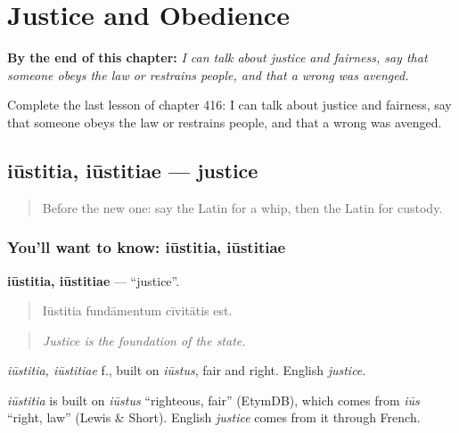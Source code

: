 
\chapter{Justice and Obedience}
\label{ch:la-justice-and-obedience}

\begin{chapteropening}
\textbf{By the end of this chapter:} \emph{I can talk about justice and fairness, say that someone obeys the law or restrains people, and that a wrong was avenged.}

Complete the last lesson of chapter 416: I can talk about justice and fairness, say that someone obeys the law or restrains people, and that a wrong was avenged.
\end{chapteropening}

\section[iūstitia, iūstitiae]{iūstitia, iūstitiae — justice}

\label{lesson:LA-C416-iustitia}



\begin{quote}
Before the new one: say the Latin for a whip, then the Latin for custody.
\end{quote}

\subsection*{You'll want to know: iūstitia, iūstitiae}
\textbf{iūstitia, iūstitiae} — \textquotedblleft{}justice\textquotedblright{}.

\begin{quote}
Iūstitia fundāmentum cīvitātis est.
\end{quote}

\begin{quote}
\emph{Justice is the foundation of the state.}
\end{quote}

\emph{iūstitia, iūstitiae} f., built on \emph{iūstus}, fair and right. English \emph{justice}.

\begin{cousinweb}
\emph{iūstitia} is built on \emph{iūstus} \textquotedblleft{}righteous, fair\textquotedblright{} (EtymDB), which comes from \emph{iūs} \textquotedblleft{}right, law\textquotedblright{} (Lewis \& Short). English \emph{justice} comes from it through French.
\end{cousinweb}

